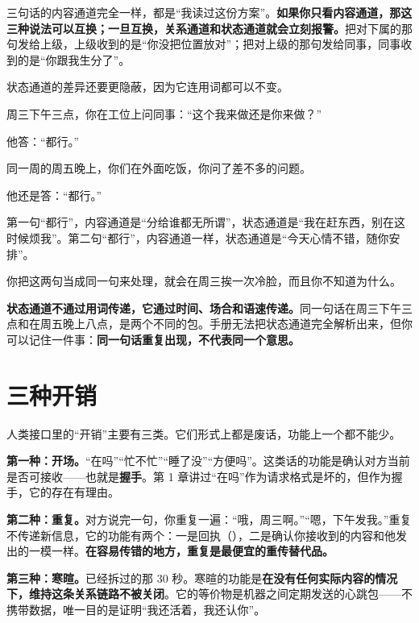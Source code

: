 三句话的内容通道完全一样，都是“我读过这份方案”。\textbf{如果你只看内容通道，那这三种说法可以互换；一旦互换，关系通道和状态通道就会立刻报警。}把对下属的那句发给上级，上级收到的是“你没把位置放对”；把对上级的那句发给同事，同事收到的是“你跟我生分了”。

状态通道的差异还要更隐蔽，因为它连用词都可以不变。

\par
\begin{mdquote}
周三下午三点，你在工位上问同事：“这个我来做还是你来做？”\par
他答：“都行。”\par
\vspace{0.3\baselineskip}
同一周的周五晚上，你们在外面吃饭，你问了差不多的问题。\par
他还是答：“都行。”\par
\vspace{0.3\baselineskip}
第一句“都行”，内容通道是“分给谁都无所谓”，状态通道是“我在赶东西，别在这时候烦我”。第二句“都行”，内容通道一样，状态通道是“今天心情不错，随你安排”。\par
\vspace{0.3\baselineskip}
你把这两句当成同一句来处理，就会在周三挨一次冷脸，而且你不知道为什么。
\end{mdquote}

\textbf{状态通道不通过用词传递，它通过时间、场合和语速传递。}同一句话在周三下午三点和在周五晚上八点，是两个不同的包。手册无法把状态通道完全解析出来，但你可以记住一件事：\textbf{同一句话重复出现，不代表同一个意思。}

\section{三种开销}

人类接口里的“开销”主要有三类。它们形式上都是废话，功能上一个都不能少。

\textbf{第一种：开场。}“在吗”“忙不忙”“睡了没”“方便吗”。这类话的功能是确认对方当前是否可接收——也就是\textbf{握手}。第 1 章讲过“在吗”作为请求格式是坏的，但作为握手，它的存在有理由。

\textbf{第二种：重复。}对方说完一句，你重复一遍：“哦，周三啊。”“嗯，下午发我。”重复不传递新信息，它的功能有两个：一是回执（），二是确认你接收到的内容和他发出的一模一样。\textbf{在容易传错的地方，重复是最便宜的重传替代品。}

\textbf{第三种：寒暄。}已经拆过的那 30 秒。寒暄的功能是\textbf{在没有任何实际内容的情况下，维持这条关系链路不被关闭}。它的等价物是机器之间定期发送的心跳包——不携带数据，唯一目的是证明“我还活着，我还认你”。

